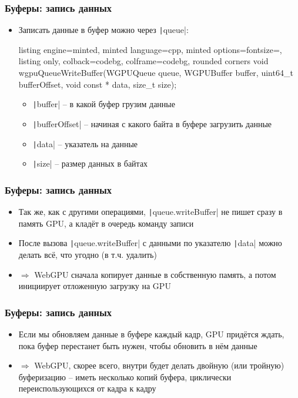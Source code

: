 \documentclass[10pt]{beamer}
\begin{document}
\begin{frame}[fragile]
\frametitle{Буферы: запись данных}
\begin{itemize}
\item Записать данные в буфер можно через \texttt|queue|:
\begin{tcblisting}{listing engine=minted, minted language=cpp, minted options={fontsize=\scriptsize}, listing only, colback=codebg, colframe=codebg, rounded corners}
void wgpuQueueWriteBuffer(WGPUQueue queue, WGPUBuffer buffer,
    uint64_t bufferOffset, void const * data, size_t size);
\end{tcblisting}
\begin{itemize}
\item \texttt|buffer| -- в какой буфер грузим данные
\item \texttt|bufferOffset| -- начиная с какого байта в буфере загрузить данные
\item \texttt|data| -- указатель на данные
\item \texttt|size| -- размер данных в байтах
\end{itemize}
\end{itemize}
\end{frame}

\begin{frame}[fragile]
\frametitle{Буферы: запись данных}
\begin{itemize}
\item Так же, как с другими операциями, \texttt|queue.writeBuffer| не пишет сразу в память GPU, а кладёт в очередь команду записи
\pause
\item После вызова \texttt|queue.writeBuffer| с данными по указателю \texttt|data| можно делать всё, что угодно (в т.ч. удалить)
\pause
\item \begin{math}\Longrightarrow\end{math} WebGPU сначала копирует данные в собственную память, а потом инициирует отложенную загрузку на GPU
\end{itemize}
\end{frame}

\begin{frame}[fragile]
\frametitle{Буферы: запись данных}
\begin{itemize}
\item Если мы обновляем данные в буфере каждый кадр, GPU придётся ждать, пока буфер перестанет быть нужен, чтобы обновить в нём данные
\pause
\item \begin{math}\Longrightarrow\end{math} WebGPU, скорее всего, внутри будет делать двойную (или тройную) буферизацию -- иметь несколько копий буфера, циклически переиспользующихся от кадра к кадру
\end{itemize}
\end{frame}
\end{document}
